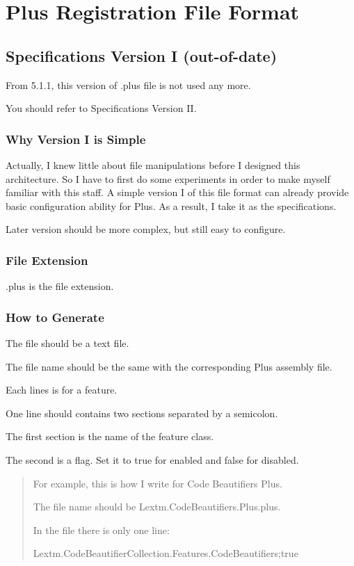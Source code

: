 
\chapter{Plus Registration File Format}

\newpage
\section{Specifications Version I (out-of-date)}
From 5.1.1, this version of .plus file is not used any more.

You should refer to Specifications Version II.

\subsection{Why Version I is Simple}
Actually, I knew little about file manipulations before I designed this
architecture. So I have to first do some experiments in order to make myself
familiar with this staff. A simple version I of this file format can already
provide basic configuration ability for Plus. As a result, I take it as the
specifications.

Later version should be more complex, but still easy to configure.

\subsection{File Extension}
.plus is the file extension.

\subsection{How to Generate}
The file should be a text file.

The file name should be the same with the corresponding Plus assembly file.

Each lines is for a feature.

One line should contains two sections separated by a semicolon.

The first section is the name of the feature class.

The second is a flag. Set it to true for enabled and false for disabled.

\begin{quotation}
For example, this is how I write for Code Beautifiers Plus.

The file name should be Lextm.CodeBeautifiers.Plus.plus.

In the file there is only one line:

Lextm.CodeBeautifierCollection.Features.Code\-Beauti\-fiers;\-true
\end{quotation}

